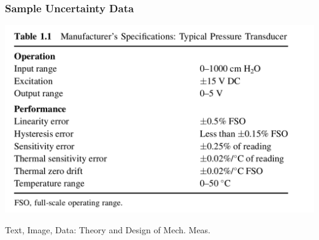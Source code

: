 \documentclass[fleqn]{beamer} %
\begin{document}
\begin{frame}[label=sectionIV]
\frametitle{Sample Uncertainty Data}

\includegraphics[scale=.22]{sample_uncertainties.png}

{\tiny Text, Image, Data: Theory and Design of Mech. Meas.}

\end{frame}
\end{document}
